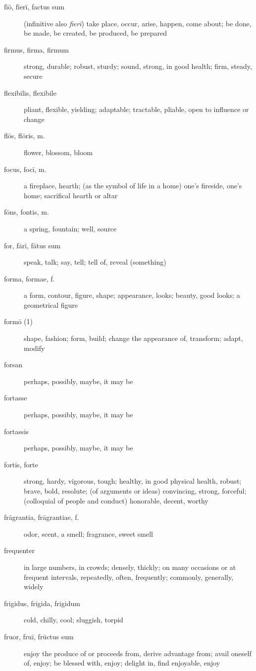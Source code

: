 \begin{description}
    \item[fīō, fīerī, factus sum] \marginnote{*}(infinitive also \textit{fierī}) take place, occur, arise, happen, come about; be done, be made, be created, be produced, be prepared
    \item[firmus, firma, firmum] strong, durable; robust, sturdy; sound, strong, in good health; firm, steady, secure
    \item[flexibilis, flexibile] pliant, flexible, yielding; adaptable; tractable, pliable, open to influence or change
    \item[flōs, flōris, m.] \marginnote{*}flower, blossom, bloom
    \item[focus, focī, m.] a fireplace, hearth; (as the symbol of life in a home) one's fireside, one's home; sacrifical hearth or altar
    \item[fōns, fontis, m.] \marginnote{*}a spring, fountain; well, source
    \item[for, fārī, fātus sum] \marginnote{*}speak, talk; say, tell; tell of, reveal (something)
    \item[forma, formae, f.] \marginnote{*}a form, contour, figure, shape; appearance, looks; beauty, good looks; a geometrical figure
    \item[formō (1)] shape, fashion; form, build; change the appearance of, transform; adapt, modify
    \item[forsan] \marginnote{*}perhaps, possibly, maybe, it may be
    \item[fortasse] \marginnote{*}perhaps, possibly, maybe, it may be
    \item[fortassis] perhaps, possibly, maybe, it may be
    \item[fortis, forte] \marginnote{*}strong, hardy, vigorous, tough; healthy, in good physical health, robust; brave, bold, resolute; (of arguments or ideas) convincing, strong, forceful; (colloquial of people and conduct) honorable, decent, worthy
    \item[frāgrantia, frāgrantiae, f.] odor, scent, a smell; fragrance, sweet smell
    \item[frequenter] in large numbers, in crowds; densely, thickly; on many occasions or at frequent intervals, repeatedly, often, frequently; commonly, generally, widely
    \item[frigidus, frigida, frigidum] cold, chilly, cool; sluggish, torpid
    \item[fruor, fruī, frūctus sum] \marginnote{*}enjoy the produce of or proceeds from, derive advantage from; avail oneself of, enjoy; be blessed with, enjoy; delight in, find enjoyable, enjoy

\end{description}
